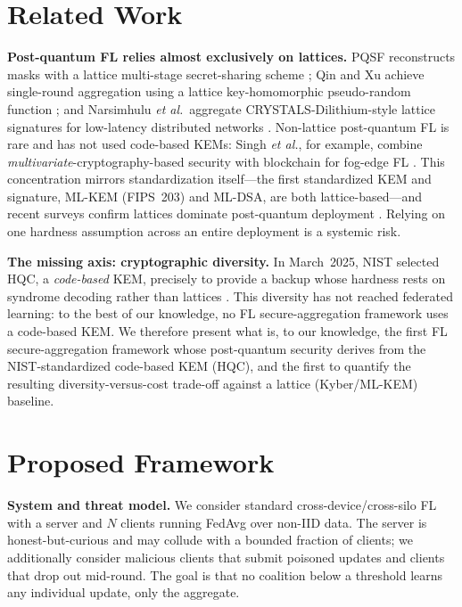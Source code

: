 \documentclass[conference]{IEEEtran}
\begin{document}
\section{Related Work}
\textbf{Post-quantum FL relies almost exclusively on lattices.} PQSF reconstructs masks
with a lattice multi-stage secret-sharing scheme \cite{pqsf2024}; Qin and Xu achieve
single-round aggregation using a lattice key-homomorphic pseudo-random function
\cite{qinxu2025}; and Narsimhulu \emph{et al.}\ aggregate CRYSTALS-Dilithium-style lattice
signatures for low-latency distributed networks \cite{narsimhulu2026}. Non-lattice
post-quantum FL is rare and has not used code-based KEMs: Singh \emph{et al.}, for example,
combine \emph{multivariate}-cryptography-based security with blockchain for fog-edge FL
\cite{singh2025pqfog}. This concentration mirrors standardization itself---the first
standardized KEM and signature, ML-KEM (FIPS~203) \cite{fips203} and ML-DSA, are both
lattice-based---and recent surveys confirm lattices dominate post-quantum deployment
\cite{nguyen2025lattice}. Relying on one hardness assumption across an entire deployment
is a systemic risk.

\textbf{The missing axis: cryptographic diversity.} In March~2025, NIST selected HQC, a
\emph{code-based} KEM, precisely to provide a backup whose hardness rests on syndrome
decoding rather than lattices \cite{nistir8545}. This diversity has not reached federated
learning: to the best of our knowledge, no FL secure-aggregation framework uses a
code-based KEM. We therefore present what is, to our knowledge, the first FL
secure-aggregation framework whose post-quantum security derives from the
NIST-standardized code-based KEM (HQC), and the first to quantify the resulting
diversity-versus-cost trade-off against a lattice (Kyber/ML-KEM) baseline.

\section{Proposed Framework}
\textbf{System and threat model.} We consider standard cross-device/cross-silo FL with a
server and $N$ clients running FedAvg over non-IID data. The server is honest-but-curious
and may collude with a bounded fraction of clients; we additionally consider malicious
clients that submit poisoned updates and clients that drop out mid-round. The goal is that
no coalition below a threshold learns any individual update, only the aggregate.
\end{document}
